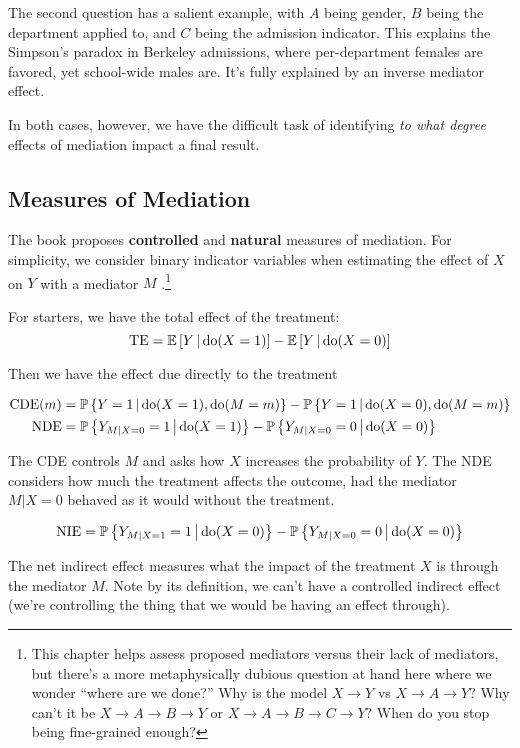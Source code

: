 \documentclass{article}
\begin{document}
The second question has a salient example, with $A$ being gender, $B$ being the department applied to, and $C$ being the admission indicator. This explains the Simpson's paradox in Berkeley admissions, where per-department females are favored, yet school-wide males are. It's fully explained by an inverse mediator effect.

In both cases, however, we have the difficult task of identifying \textit{to what degree} effects of mediation impact a final result.

\subsection{Measures of Mediation}

The book proposes \textbf{controlled} and \textbf{natural} measures of mediation. For simplicity, we consider binary indicator variables when estimating the effect of $X$ on $Y$ with a mediator $M$ \cite{pearl2014interpretation}.\footnote{This chapter helps assess proposed mediators versus their lack of mediators, but there's a more metaphysically dubious question at hand here where we wonder ``where are we done?'' Why is the model $X\rightarrow Y$ vs $X\rightarrow A \rightarrow Y$? Why can't it be $X\rightarrow A \rightarrow B\rightarrow Y$ or $X\rightarrow A \rightarrow B\rightarrow C\rightarrow Y$? When do you stop being fine-grained enough?}

For starters, we have the total effect of the treatment:
$$
\mathrm{TE}=\operatorname{\mathbb{E}}\left[ Y \,\middle|\, \mathrm{do}(X=1) \right]-\operatorname{\mathbb{E}}\left[ Y \,\middle|\, \mathrm{do}(X=0) \right]
$$

Then we have the effect due directly to the treatment

\begin{align*}
  \mathrm{CDE}(m)&=\operatorname{\mathbb{P}}\left\{ Y=1 \,\middle|\, \mathrm{do}(X=1), \mathrm{do}(M=m) \right\} -\operatorname{\mathbb{P}}\left\{ Y=1 \,\middle|\, \mathrm{do}(X=0), \mathrm{do}(M=m) \right\}\\
  \mathrm{NDE}&=\operatorname{\mathbb{P}}\left\{ Y_{M|X=0}=1 \,\middle|\, \mathrm{do}(X=1) \right\} -\operatorname{\mathbb{P}}\left\{ Y_{M|X=0}=0 \,\middle|\, \mathrm{do}(X=0) \right\}
\end{align*}

The CDE controls $M$ and asks how $X$ increases the probability of $Y$. The NDE considers how much the treatment affects the outcome, had the mediator $M|X=0$ behaved as it would without the treatment.

$$
  \mathrm{NIE}=\operatorname{\mathbb{P}}\left\{ Y_{M|X=1}=1 \,\middle|\, \mathrm{do}(X=0) \right\} -\operatorname{\mathbb{P}}\left\{ Y_{M|X=0}=0 \,\middle|\, \mathrm{do}(X=0) \right\}
$$

The net indirect effect measures what the impact of the treatment $X$ is through the mediator $M$. Note by its definition, we can't have a controlled indirect effect (we're controlling the thing that we would be having an effect through).
\end{document}
